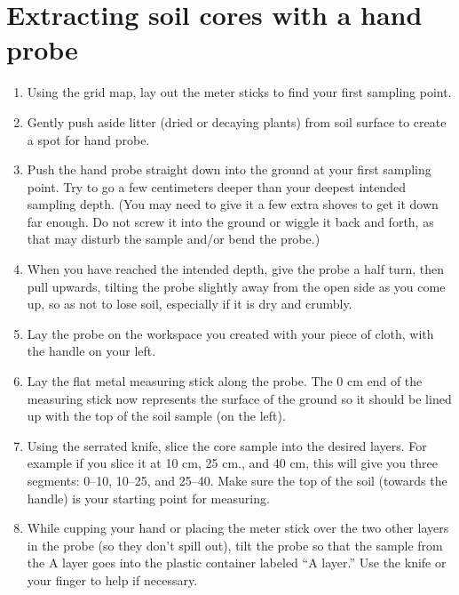\documentclass[11pt,letterpaper,twoside,onecolumn]{memoir}
\begin{document}
\section*{Extracting soil cores with a hand probe}

\begin{figure}

\end{figure}

\begin{enumerate}
\item Using the grid map, lay out the meter sticks to find your first sampling point. 

\item Gently push aside litter (dried or decaying plants) from soil surface to create a spot for hand probe. 

\item Push the hand probe straight down into the ground at your first sampling point.  Try to go a few centimeters deeper than your deepest intended sampling depth. (You may need to give it a few extra shoves to get it down far enough. Do not screw it into the ground or wiggle it back and forth, as that may disturb the sample and/or bend the probe.) 

\item When you have reached the intended depth, give the probe a half turn, then pull upwards, tilting the probe slightly away from the open side as you come up, so as not to lose soil, especially if it is dry and crumbly.

\item Lay the probe on the workspace you created with your piece of cloth, with the handle on your left. 

\item Lay the flat metal measuring stick along the probe. The 0 cm end of the measuring stick now represents the surface of the ground so it should be lined up with the top of the soil sample (on the left).

\item Using the serrated knife, slice the core sample into the desired layers. For example if you slice it at 10 cm, 25 cm., and 40 cm, this will give you three segments: 0--10, 10--25, and 25--40. Make sure the top of the soil (towards the handle) is your starting point for measuring.

\item While cupping your hand or placing the meter stick over the two other layers in the probe (so they don't spill out), tilt the probe so that the sample from the A layer goes into the plastic container labeled ``A layer.''  Use the knife or your finger to help if necessary.


\end{enumerate}
\end{document}
